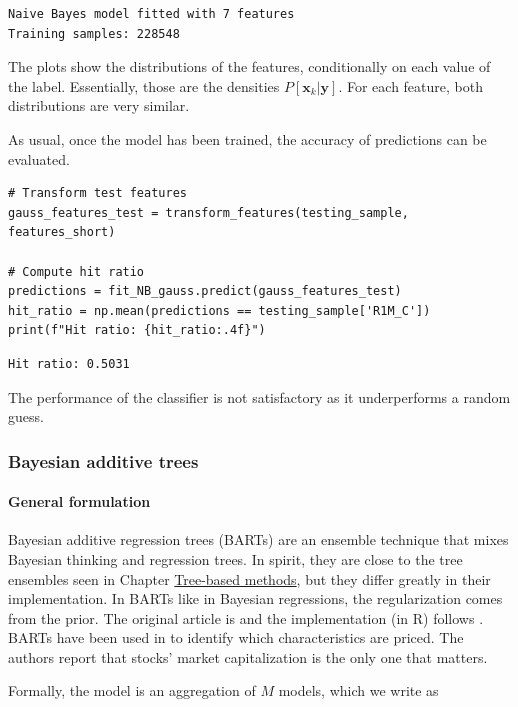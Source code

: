 \begin{verbatim}
Naive Bayes model fitted with 7 features
Training samples: 228548
\end{verbatim}

The plots show the distributions of the features, conditionally on each value of the label. Essentially, those are the densities $P[\textbf{x}_k| \textbf{y}]$. For each feature, both distributions are very similar.

As usual, once the model has been trained, the accuracy of predictions can be evaluated.

\begin{verbatim}
# Transform test features
gauss_features_test = transform_features(testing_sample, features_short)

# Compute hit ratio
predictions = fit_NB_gauss.predict(gauss_features_test)
hit_ratio = np.mean(predictions == testing_sample['R1M_C'])
print(f"Hit ratio: {hit_ratio:.4f}")
\end{verbatim}

\begin{verbatim}
Hit ratio: 0.5031
\end{verbatim}

The performance of the classifier is not satisfactory as it underperforms a random guess.

\subsubsection{Bayesian additive trees}\label{BART}

\paragraph{General formulation}

Bayesian additive regression trees (BARTs) are an ensemble technique that mixes Bayesian thinking and regression trees. In spirit, they are close to the tree ensembles seen in Chapter \href{/chap-07-trees}{Tree-based methods}, but they differ greatly in their implementation. In BARTs like in Bayesian regressions, the regularization comes from the prior. The original article is \cite{chipman2010bart} and the implementation (in R) follows \cite{sparapani2019r}. BARTs have been used in \cite{shu2021identifying} to identify which characteristics are priced. The authors report that stocks' market capitalization is the only one that matters.

Formally, the model is an aggregation of $M$ models, which we write as

